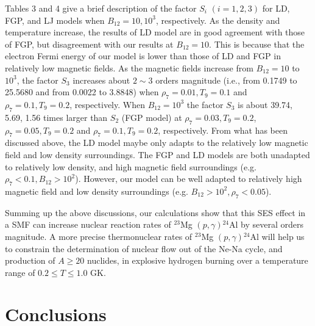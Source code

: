 \documentclass[manuscript]{aastex}
\begin{document}
Tables 3 and 4 give a brief description of the factor $S_i$ $ (i=1,
2, 3)$ for LD, FGP, and LJ models when $B_{12}=10, 10^3$,
respectively. As the density and temperature increase, the results
of LD model are in good agreement with those of FGP, but
disagreement with our results at $B_{12}=10$. This is because that
the electron Fermi energy of our model is lower than those of LD and
FGP in relatively low magnetic fields. As the magnetic fields
increase from $B_{12}=10$ to $10^3$, the factor $S_3$ increases
about $2\sim3$ orders magnitude (i.e., from 0.1749 to 25.5680 and
from 0.0022 to 3.8848) when $\rho_7=0.01, T_9=0.1$ and $\rho_7=0.1,
T_9=0.2$, respectively. When $B_{12}=10^3$ the factor $S_3$ is about
39.74, 5.69, 1.56 times larger than $S_2$ (FGP model) at
$\rho_7=0.03, T_9=0.2$, $\rho_7=0.05, T_9=0.2$ and $\rho_7=0.1,
T_9=0.2$, respectively. From what has been discussed above, the LD
model maybe only adapts to the relatively low magnetic field and low
density surroundings. The FGP and LD models are both unadapted to
relatively low density, and high magnetic field surroundings (e.g.
$\rho_7<0.1, B_{12}>10^2$). However, our model can be well adapted
to relatively high magnetic field and low density surroundings (e.g.
$B_{12}>10^2, \rho_7<0.05$).


Summing up the above discussions, our calculations show that this
SES effect in a SMF can increase nuclear reaction rates of $^{23}$Mg
$(p, \gamma)$$^{24}$Al by several orders magnitude. A more precise
thermonuclear rates of $^{23}$Mg $(p, \gamma)$$^{24}$Al will help us
to constrain the determination of nuclear flow out of the Ne-Na
cycle, and production of $A\geq20$ nuclides, in explosive hydrogen
burning over a temperature range of $0.2\leq T \leq 1.0$ GK.


\section{Conclusions}
\end{document}

